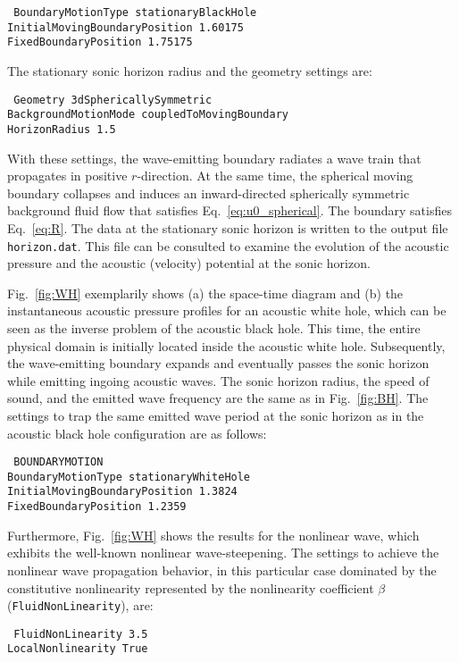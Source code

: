 {\tt
BoundaryMotionType stationaryBlackHole \\
InitialMovingBoundaryPosition 1.60175 \\
FixedBoundaryPosition 1.75175
}

The stationary sonic horizon radius and the geometry settings are:

{\tt
Geometry 3dSphericallySymmetric \\
BackgroundMotionMode coupledToMovingBoundary \\
HorizonRadius 1.5
}

With these settings, the wave-emitting boundary radiates a wave train that propagates in positive $r$-direction. At the same time, the spherical moving boundary collapses and induces an inward-directed spherically symmetric background fluid flow that satisfies Eq.~\eqref{eq:u0_spherical}. The boundary satisfies Eq.~\eqref{eq:R}. The data at the stationary sonic horizon is written to the output file {\tt horizon.dat}. This file can be consulted to examine the evolution of the acoustic pressure and the acoustic (velocity) potential at the sonic horizon.

Fig.~\ref{fig:WH} exemplarily shows (a) the space-time diagram and (b) the instantaneous acoustic pressure profiles for an acoustic white hole, which can be seen as the inverse problem of the acoustic black hole. This time, the entire physical domain is initially located inside the acoustic white hole. Subsequently, the wave-emitting boundary expands and eventually passes the sonic horizon while emitting ingoing acoustic waves. The sonic horizon radius, the speed of sound, and the emitted wave frequency are the same as in Fig.~\ref{fig:BH}. The settings to trap the same emitted wave period at the sonic horizon as in the acoustic black hole configuration are as follows:

{\tt
BOUNDARYMOTION \\
BoundaryMotionType stationaryWhiteHole \\
InitialMovingBoundaryPosition 1.3824 \\
FixedBoundaryPosition 1.2359
}

Furthermore, Fig.~\ref{fig:WH} shows the results for the nonlinear wave, which exhibits the well-known nonlinear wave-steepening. The settings to achieve the nonlinear wave propagation behavior, in this particular case dominated by the constitutive nonlinearity represented by the nonlinearity coefficient $\beta$ ({\tt FluidNonLinearity}), are:

    {\tt
        FluidNonLinearity 3.5 \\
        LocalNonlinearity True
    }

